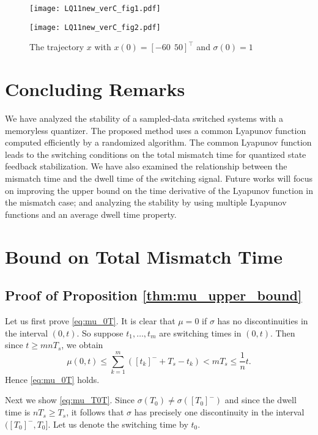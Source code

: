 \documentclass[a4, 11pt]{article}
\begin{document}
\begin{figure}[b]
\centering
{}
{\texttt{[image: LQ11new\_verC\_fig1.pdf]}}

{\texttt{[image: LQ11new\_verC\_fig2.pdf]}}
\caption{The trajectory $x$ with $x(0) = [-60~~50]^{\top}$ and $\sigma(0)=1$
\label{fig:LQ11fig}}
\end{figure}










\section{Concluding Remarks}
We have analyzed the stability of a sampled-data switched systems with 
a memoryless quantizer.
The proposed method uses a common Lyapunov function 
computed efficiently by a randomized algorithm.
The common Lyapunov function leads to the switching conditions on the total mismatch time
for quantized state feedback stabilization.
We have also examined the relationship between the mismatch time
and the dwell time of the switching signal.
Future works will focus on improving the upper bound on the time
derivative of the Lyapunov function in the mismatch case; and
analyzing the stability by using
multiple Lyapunov functions and an average dwell time property.


\appendix
\section{Bound on Total Mismatch Time}    \subsection{Proof of Proposition \ref{thm:mu_upper_bound}} 
Let us first prove \eqref{eq:mu_0T}.
It is clear that $\mu = 0$ if $\sigma$ has no discontinuities in the interval $(0,t)$.
So suppose $t_1,\dots,t_m$ are switching times in $(0,t)$.
Then since $t \geq mnT_s$, we obtain
\begin{equation*}
\mu(0,t) \leq \sum_{k=1}^{m} ([t_k]^-+T_s - t_k)
< mT_s \leq \frac{1}{n}t.
\end{equation*}
Hence \eqref{eq:mu_0T} holds.

Next we show \eqref{eq:mu_T0T}.
Since $\sigma(T_0) \not= \sigma([T_0]^-)$ and since
the dwell time is $nT_s \geq T_s$, it follows that
$\sigma$ has precisely one discontinuity in the interval $([T_0]^-, T_0]$.
Let us denote the switching time by $t_0$.
\end{document}
